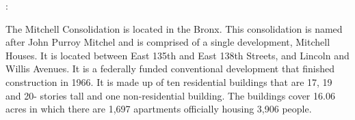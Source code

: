 :     

   

The Mitchell Consolidation is located in the Bronx. This consolidation is named after John Purroy Mitchel and is comprised of a single development, Mitchell Houses. It is located between East 135th and East 138th Streets, and Lincoln and Willis Avenues. It is a federally funded conventional development that finished construction in 1966. It is made up of ten residential buildings that are 17, 19 and 20- stories tall and one non-residential building. The buildings cover 16.06 acres in which there are 1,697 apartments officially housing 3,906 people. 